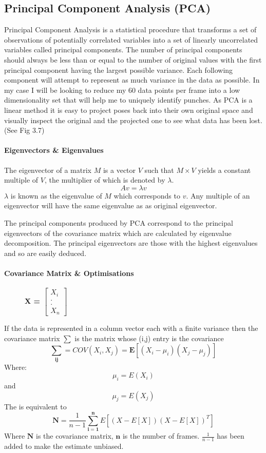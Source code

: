 \subsection{Principal Component Analysis (PCA)}
\label{subsec:subsec01}
Principal Component Analysis is a statistical procedure that transforms a set of observations of potentially correlated variables into a set of linearly uncorrelated variables called principal components. The number of principal components should always be less than or equal to the number of original values with the first principal component having the largest possible variance. Each following component will attempt to represent as much variance in the data as possible. In my case I will be looking to reduce my 60 data points per frame into a low dimensionality set that will help me to uniquely identify punches.
As PCA is a linear method it is easy to project poses back into their own original space and visually inspect the original and the projected one to see what data has been lost. (See Fig 3.7)

\paragraph{Eigenvectors \& Eigenvalues}
The eigenvector of a matrix $M$ is a vector $V$ such that $M\times V$ yields a constant multiple of $V$, the multiplier of which is denoted by $\lambda.$
$$Av = \lambda v$$
$\lambda$ is known as the eigenvalue of $M$ which corresponds to $v$. Any multiple of an eigenvector will have the same eigenvalue as as original eigenvector.

The principal components produced by PCA correspond to the principal eigenvectors of the covariance matrix which are calculated by eigenvalue decomposition. The principal eigenvectors are those with the highest eigenvalues and so are easily deduced. 

\paragraph{Covariance Matrix \& Optimisations }
\begin{figure}
\vspace{-15pt}
\hspace{15pt}
\bf{X = } $\begin{bmatrix} X_i\\.\\.\\X_n \end{bmatrix}$\newline
\end{figure}
If the data is represented in a column vector each with a finite variance then the covariance matrix $\mathbf{\sum}$ is the matrix whose (i,j) entry is the covariance
$$\mathbf{\sum_{ij}} = COV(X_i,X_j) = \mathbf{E}[(X_i - \mu_i )(X_j - \mu_j )]$$
Where:
$$\mu_i = E(X_i)$$ and $$\mu_j = E(X_j)$$
The is equivalent to $$\mathbf{N} = \frac{1}{n-1}\mathbf{\sum_{i=1}^n}E[(X-E[X])(X-E[X])^T]$$ 
Where $\mathbf{N}$ is the covariance matrix, $\mathbf{n}$ is the number of frames. $\frac{1}{n-1}$ has been added to make the estimate unbiased.

